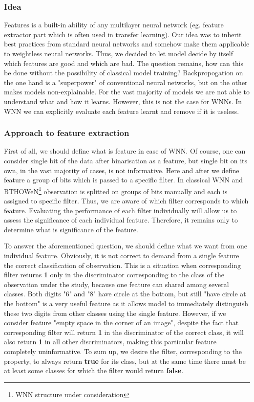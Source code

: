 \documentclass{article}[12pt]
\begin{document}
\subsubsection*{Idea}
Features is a built-in ability of any multilayer neural network (eg. feature extractor part which is often used in transfer learning). Our idea was to inherit best practices from standard neural networks and somehow make them applicable to weightless neural networks. Thus, we decided to let model decide by itself which features are good and which are bad. The question remains, how can this be done without the possibility of classical model training? Backpropogation on the one hand is a "superpower" of conventional neural networks, but on the other makes models non-explainable. For the vast majority of models we are not able to understand what and how it learns. However, this is not the case for WNNs. In WNN we can explicitly evaluate each feature learnt and remove if it is useless.

\subsubsection*{Approach to feature extraction}
First of all, we should define what is feature in case of WNN. Of course, one can consider single bit of the data after binarisation as a feature, but single bit on its own, in the vast majority of cases, is not informative. Here and after we define feature a group of bits which is passed to a specific filter. In classical WNN and BTHOWeN\footnote{WNN structure under consideration} observation is splitted on groups of bits manually and each is assigned to specific filter. Thus, we are aware of which filter corresponds to which feature. Evaluating the performance of each filter individually will allow us to assess the significance of each individual feature. Therefore, it remains only to determine what is significance of the feature.

To answer the aforementioned question, we should define what we want from one individual feature. Obviously, it is not correct to demand from a single feature the correct classification of observation. This is a situation when corresponding filter returns \textbf{1} only in the discriminator corresponding to the class of the observation under the study, because one feature can shared among several classes. Both digits "6" and "8" have circle at the bottom, but still "have circle at the bottom" is a very useful feature as it allows model to immediately distinguish these two digits from other classes using the single feature. However, if we consider feature "empty space in the corner of an image", despite the fact that corresponding filter will return \textbf{1} in the discriminator of the correct class, it will also return \textbf{1} in all other discriminators, making this particular feature completely uninformative. To sum up, we desire the filter, corresponding to the property, to always return \textbf{true} for its class, but at the same time there must be at least some classes for which the filter would return \textbf{false}.
\end{document}
